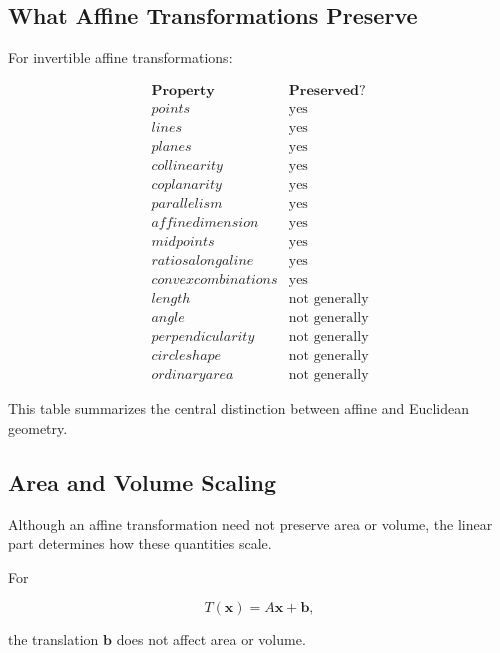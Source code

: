 \subsection{What Affine Transformations Preserve}
\label{subsec:affine-invariants}

For invertible affine transformations:

\[
\begin{array}{c|c}
\textbf{Property} & \textbf{Preserved?}\\
\hline
points & \text{yes}\\
lines & \text{yes}\\
planes & \text{yes}\\
collinearity & \text{yes}\\
coplanarity & \text{yes}\\
parallelism & \text{yes}\\
affine dimension & \text{yes}\\
midpoints & \text{yes}\\
ratios along a line & \text{yes}\\
convex combinations & \text{yes}\\
length & \text{not generally}\\
angle & \text{not generally}\\
perpendicularity & \text{not generally}\\
circle shape & \text{not generally}\\
ordinary area & \text{not generally}
\end{array}
\]

This table summarizes the central distinction between affine and Euclidean
geometry.

\subsection{Area and Volume Scaling}
\label{subsec:affine-area-volume-scaling}

Although an affine transformation need not preserve area or volume, the
linear part determines how these quantities scale.

For

\[ T(\mathbf{x})=A\mathbf{x}+\mathbf{b}, \]

the translation \(\mathbf{b}\) does not affect area or volume.

